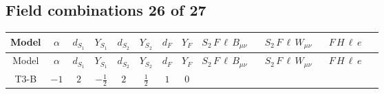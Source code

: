 \documentclass[8pt]{article}
\begin{document}
\begin{landscape}
\subsection*{Field combinations 26 of 27}
\begin{longtable}{@{}cccccccc >{\raggedright\arraybackslash}p{0.21\linewidth} >{\raggedright\arraybackslash}p{0.21\linewidth} >{\raggedright\arraybackslash}p{0.21\linewidth}@{}}
\toprule
Model & $\alpha$ & $d_{S_1}$ & $Y_{S_1}$ & $d_{S_2}$ & $Y_{S_2}$ & $d_F$ & $Y_F$ & $S_2\,F\,\ell\,B_{\mu\nu}$ & $S_2\,F\,\ell\,W_{\mu\nu}$ & $F\,H\,\ell\,e$ \\
\midrule
\endfirsthead
\toprule
Model & $\alpha$ & $d_{S_1}$ & $Y_{S_1}$ & $d_{S_2}$ & $Y_{S_2}$ & $d_F$ & $Y_F$ & $S_2\,F\,\ell\,B_{\mu\nu}$ & $S_2\,F\,\ell\,W_{\mu\nu}$ & $F\,H\,\ell\,e$ \\
\midrule
\endhead
T3-B & $-1$ & $2$ & $-\frac{1}{2}$ & $2$ & $\frac{1}{2}$ & $1$ & $0$ & \scriptsize\adjustbox{max width=\linewidth}{$\begin{gathered} +\frac{i \hbar  \overline{y_{1,i_2,r_2}} \overline{y_{2,i_1,r_1}} F_{r_2}{}^T\, C\, \gamma ^{\mu _1}\, P_L\, L_{a_1,i_1} B_{\mu _1\mu _2} S_{2,j_1} y_{1,i_2,r_1} {\mathcal{C}_{LS_2F}}^{*}_{a_1,j_1}}{8 m_1^2} \\ -\frac{i \hbar  \overline{y_{1,i_1,r_2}} \overline{y_{2,i_2,r_1}} F_{r_2}{}^T\, C\, \gamma ^{\mu _1}\, P_L\, L_{a_1,i_1} B_{\mu _1\mu _2} S_{2,j_1} y_{1,i_2,r_1} {\mathcal{C}_{LS_2F}}^{*}_{a_1,j_1}}{8 m_1^2} \\ -\frac{i \hbar  \overline{y_{1,i_1,r_1}} \overline{y_{2,i_2,r_2}} F_{r_2}{}^T\, C\, \gamma ^{\mu _1}\, P_L\, L_{a_1,i_1} B_{\mu _1\mu _2} S_{2,j_1} y_{1,i_2,r_1} {\mathcal{C}_{LS_2F}}^{*}_{a_1,j_1}}{48 m_1^2}\end{gathered}$} & \scriptsize\adjustbox{max width=\linewidth}{$\begin{gathered} +\frac{i \hbar  \overline{y_{1,i_1,r_2}} \overline{y_{2,i_2,r_1}} F_{r_2}{}^T\, C\, \gamma ^{\mu _1}\, P_L\, L_{a_1,i_1} \text{cg1}_{j_1,A_1,a_1} S_{2,j_1} y_{1,i_2,r_1} W_{\mu _1\mu _2}^{A_1}}{4 m_1^2} \\ +\frac{i \hbar  \overline{y_{1,i_1,r_1}} \overline{y_{2,i_2,r_2}} F_{r_2}{}^T\, C\, \gamma ^{\mu _1}\, P_L\, L_{a_1,i_1} \text{cg1}_{j_1,A_1,a_1} S_{2,j_1} y_{1,i_2,r_1} W_{\mu _1\mu _2}^{A_1}}{24 m_1^2} \\ +\frac{i \hbar  \overline{y_{1,i_1,r_2}} \overline{L_{a_1,i_2}}\, \gamma ^{\mu _1}\, P_R\, F_{r_1} y_{1,i_2,r_2} y_{2,i_1,r_1} \text{Bar}(\text{cg1})_{j_1,A_1,a_1} W_{\mu _1\mu _2}^{A_1} S_{2,j_1}{}^{\dagger }}{24 m_1^2}\end{gathered}$} & \scriptsize\adjustbox{max width=\linewidth}{$\begin{gathered} -\frac{\hbar  \overline{y_{1,i_3,r_1}} \overline{L_{a_1,i_2}}\, P_R\, e_{i_1} H_{a_1} M_F^2 y_{1,i_2,r_1} Y_{e,i_3,i_1}}{4 m_1^2} \\ -\frac{\hbar  \overline{y_{1,i_1,r_1}} \overline{Y_{e,i_3,i_2}} \overline{e_{i_2}}\, P_L\, L_{a_1,i_1} M_F^2 y_{1,i_3,r_1} H_{a_1}{}^{\dagger }}{4 m_1^2}\end{gathered}$} \\

\end{longtable}
\end{landscape}
\end{document}
